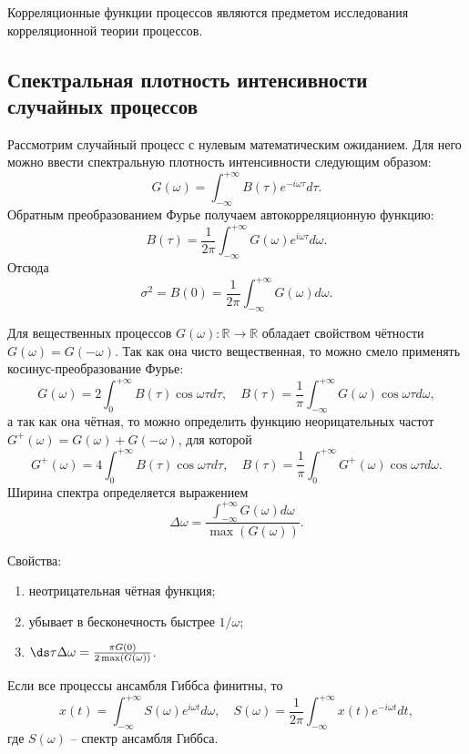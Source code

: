 Корреляционные функции процессов являются предметом исследования корреляционной
теории процессов.

\subsection{Спектральная плотность интенсивности случайных процессов}
Рассмотрим случайный процесс с нулевым математическим ожиданием. Для него можно
ввести спектральную плотность интенсивности следующим образом:
\[
    G(\omega) = \int_{-\infty}^{+\infty} B(\tau)e^{-i\omega\tau}d\tau.
\]
Обратным преобразованием Фурье получаем автокорреляционную функцию:
\[
    B(\tau) =
        \frac{1}{2\pi}\int_{-\infty}^{+\infty} G(\omega)e^{i\omega\tau}d\omega.
\]
Отсюда
\[
    \sigma^2 = B(0) = \frac{1}{2\pi}\int_{-\infty}^{+\infty} G(\omega)d\omega.
\]

Для вещественных процессов \( G(\omega): \mathbb{R}\to\mathbb{R} \) обладает
свойством чётности \( G(\omega) = G(-\omega) \). Так как она чисто вещественная,
то можно смело применять косинус-преобразование Фурье:
\[
    G(\omega) = 2\int_0^{+\infty} B(\tau)\cos\omega\tau d\tau,\quad
    B(\tau) =
        \frac{1}{\pi}\int_{-\infty}^{+\infty} G(\omega) \cos\omega\tau d\omega,
\]
а так как она чётная, то можно определить функцию неорицательных частот
\( G^+(\omega) = G(\omega) + G(-\omega) \),  для которой
\[
    G^+(\omega) = 4\int_0^{+\infty} B(\tau)\cos\omega\tau d\tau,\quad
    B(\tau) =
        \frac{1}{\pi}\int_0^{+\infty} G^+(\omega) \cos\omega\tau d\omega.
\]
Ширина спектра определяется выражением
\[
    \Delta\omega =
        \frac{\int_{-\infty}^{+\infty}G(\omega)d\omega}{\max(G(\omega))}.
\]

Свойства:
\begin{enumerate}
    \item неотрицательная чётная функция;
    \item убывает в бесконечность быстрее \( 1/\omega \);
    \item \( \ds \tau\Delta\omega = \frac{\pi G(0)}{2\max(G(\omega))} \).
\end{enumerate}

Если все процессы ансамбля Гиббса финитны, то
\[
    x(t) = \int_{-\infty}^{+\infty}S(\omega)e^{i\omega t}d\omega,\quad
    S(\omega) = \frac{1}{2\pi}\int_{-\infty}^{+\infty}x(t)e^{-i\omega t}dt,
\]
где \( S(\omega) \) -- спектр ансамбля Гиббса.

